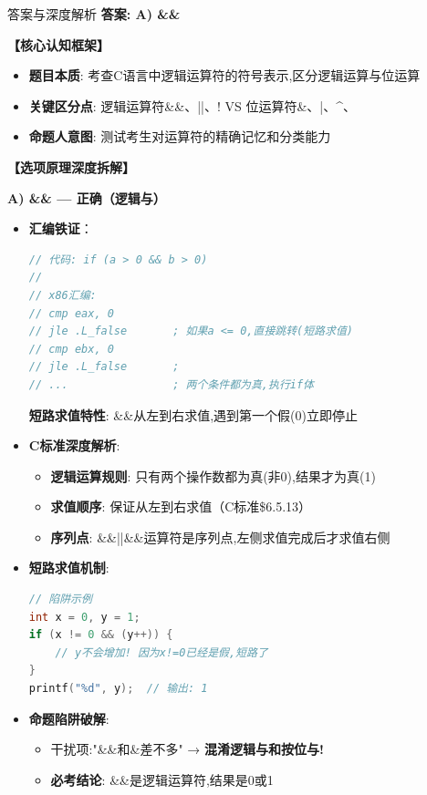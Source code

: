 \documentclass[a4paper,12pt]{article}
\begin{document}
\begin{bluebox}{答案与深度解析}
	\textbf{答案: A) \&\&}

	\textbf{【核心认知框架】}
	\begin{itemize}[leftmargin=*, nosep]
		\item \textbf{题目本质}: 考查C语言中逻辑运算符的符号表示,区分逻辑运算与位运算
		\item \textbf{关键区分点}: 逻辑运算符\&\&、||、! VS 位运算符\&、|、^、~
		\item \textbf{命题人意图}: 测试考生对运算符的精确记忆和分类能力
	\end{itemize}

	\textbf{【选项原理深度拆解】}

	\textbf{A) \&\& — 正确（逻辑与）}
	\begin{itemize}[leftmargin=*, nosep]
		\item \textbf{汇编铁证}：
		      \begin{lstlisting}[language=C]
// 代码: if (a > 0 && b > 0)
//
// x86汇编:
// cmp eax, 0
// jle .L_false       ; 如果a <= 0,直接跳转(短路求值)
// cmp ebx, 0
// jle .L_false       ;
// ...                ; 两个条件都为真,执行if体
    \end{lstlisting}
		      \textbf{短路求值特性}: \&\&从左到右求值,遇到第一个假(0)立即停止

		\item \textbf{C标准深度解析}:
		      \begin{itemize}
			      \item \textbf{逻辑运算规则}: 只有两个操作数都为真(非0),结果才为真(1)
			      \item \textbf{求值顺序}: 保证从左到右求值（C标准\$6.5.13）
			      \item \textbf{序列点}: \&\&||\&\&运算符是序列点,左侧求值完成后才求值右侧
		      \end{itemize}

		\item \textbf{短路求值机制}:
		      \begin{lstlisting}[language=C]
// 陷阱示例
int x = 0, y = 1;
if (x != 0 && (y++)) {
    // y不会增加! 因为x!=0已经是假,短路了
}
printf("%d", y);  // 输出: 1
    \end{lstlisting}

		\item \textbf{命题陷阱破解}:
		      \begin{itemize}
			      \item 干扰项:"\&\&和\&差不多" → \textbf{混淆逻辑与和按位与!}
			      \item \textbf{必考结论}: \&\&是逻辑运算符,结果是0或1
		      \end{itemize}
	\end{itemize}


\end{bluebox}
\end{document}
